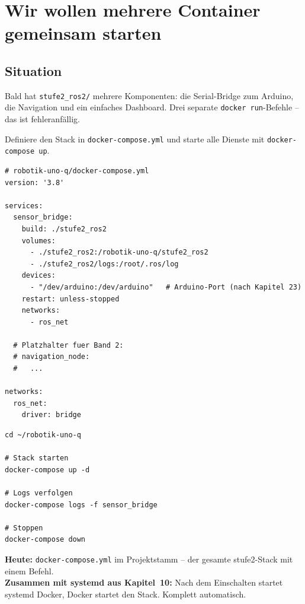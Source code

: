 \chapter{Wir wollen mehrere Container gemeinsam starten}

\kapitelstruktur

\section{Situation}

Bald hat \texttt{stufe2\_ros2/} mehrere Komponenten:
die Serial-Bridge zum Arduino, die Navigation und
ein einfaches Dashboard. Drei separate
\texttt{docker run}-Befehle -- das ist fehleranfällig.

\begin{aufgabeBox}
Definiere den Stack in \texttt{docker-compose.yml}
und starte alle Dienste mit \texttt{docker-compose up}.
\end{aufgabeBox}

\begin{lstlisting}[style=yaml]
# robotik-uno-q/docker-compose.yml
version: '3.8'

services:
  sensor_bridge:
    build: ./stufe2_ros2
    volumes:
      - ./stufe2_ros2:/robotik-uno-q/stufe2_ros2
      - ./stufe2_ros2/logs:/root/.ros/log
    devices:
      - "/dev/arduino:/dev/arduino"   # Arduino-Port (nach Kapitel 23)
    restart: unless-stopped
    networks:
      - ros_net

  # Platzhalter fuer Band 2:
  # navigation_node:
  #   ...

networks:
  ros_net:
    driver: bridge
\end{lstlisting}

\begin{lstlisting}[style=bash]
cd ~/robotik-uno-q

# Stack starten
docker-compose up -d

# Logs verfolgen
docker-compose logs -f sensor_bridge

# Stoppen
docker-compose down
\end{lstlisting}

\begin{projektBox}
\textbf{Heute:} \texttt{docker-compose.yml} im Projektstamm --
der gesamte stufe2-Stack mit einem Befehl.\\
\textbf{Zusammen mit systemd aus Kapitel~10:} Nach dem Einschalten
startet systemd Docker, Docker startet den Stack.
Komplett automatisch.
\end{projektBox}

